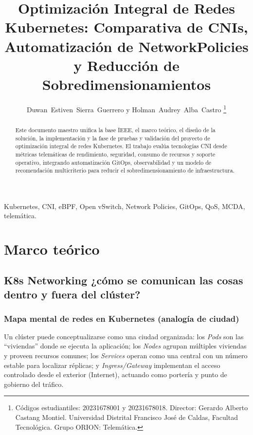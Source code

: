 \documentclass[journal]{IEEEtran}
\title{Optimización Integral de Redes Kubernetes: Comparativa de CNIs, Automatización de NetworkPolicies y Reducción de Sobredimensionamientos}
\author{Duwan~Estiven~Sierra~Guerrero y Holman~Audrey~Alba~Castro%
\thanks{Códigos estudiantiles: 20231678001 y 20231678018. Director: Gerardo Alberto Castang Montiel. Universidad Distrital Francisco José de Caldas, Facultad Tecnológica. Grupo ORION: Telemática.}}
\begin{document}
\maketitle

\begin{abstract}
Este documento maestro unifica la base IEEE, el marco teórico, el diseño de la solución, la implementación y la fase de pruebas y validación del proyecto de optimización integral de redes Kubernetes. El trabajo evalúa tecnologías CNI desde métricas telemáticas de rendimiento, seguridad, consumo de recursos y soporte operativo, integrando automatización GitOps, observabilidad y un modelo de recomendación multicriterio para reducir el sobredimensionamiento de infraestructura.
\end{abstract}

\begin{IEEEkeywords}
Kubernetes, CNI, eBPF, Open vSwitch, Network Policies, GitOps, QoS, MCDA, telemática.
\end{IEEEkeywords}

\section{Marco teórico}
% 
% 
% 
\subsection{K8s Networking ¿cómo se comunican las cosas dentro y fuera del clúster?}


\medskip
\subsubsection{Mapa mental de redes en Kubernetes (analogía de ciudad)}

Un clúster puede conceptualizarse como una ciudad organizada: los \emph{Pods} son las “viviendas” donde se ejecuta la aplicación; los \emph{Nodes} agrupan múltiples viviendas y proveen recursos comunes; los \emph{Services} operan como una central con un número estable para localizar réplicas; y \emph{Ingress/Gateway} implementan el acceso controlado desde el exterior (Internet), actuando como portería y punto de gobierno del tráfico.
\end{document}
